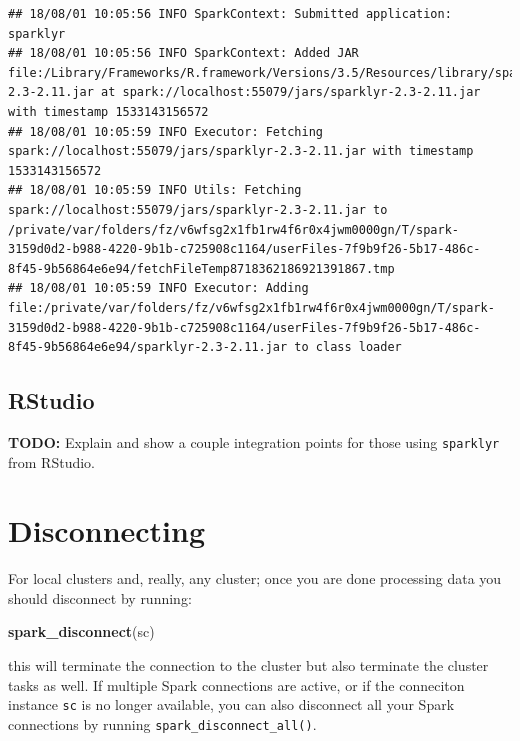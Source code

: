 \documentclass[]{book}
\newenvironment{Shaded}{\begin{snugshade}}{\end{snugshade}}
\newcommand{\KeywordTok}[1]{\textcolor[rgb]{0.13,0.29,0.53}{\textbf{#1}}}
\newcommand{\NormalTok}[1]{#1}
\theoremstyle{definition}
\theoremstyle{definition}
\theoremstyle{definition}
\theoremstyle{remark}
\begin{document}
\begin{verbatim}
## 18/08/01 10:05:56 INFO SparkContext: Submitted application: sparklyr
## 18/08/01 10:05:56 INFO SparkContext: Added JAR file:/Library/Frameworks/R.framework/Versions/3.5/Resources/library/sparklyr/java/sparklyr-2.3-2.11.jar at spark://localhost:55079/jars/sparklyr-2.3-2.11.jar with timestamp 1533143156572
## 18/08/01 10:05:59 INFO Executor: Fetching spark://localhost:55079/jars/sparklyr-2.3-2.11.jar with timestamp 1533143156572
## 18/08/01 10:05:59 INFO Utils: Fetching spark://localhost:55079/jars/sparklyr-2.3-2.11.jar to /private/var/folders/fz/v6wfsg2x1fb1rw4f6r0x4jwm0000gn/T/spark-3159d0d2-b988-4220-9b1b-c725908c1164/userFiles-7f9b9f26-5b17-486c-8f45-9b56864e6e94/fetchFileTemp8718362186921391867.tmp
## 18/08/01 10:05:59 INFO Executor: Adding file:/private/var/folders/fz/v6wfsg2x1fb1rw4f6r0x4jwm0000gn/T/spark-3159d0d2-b988-4220-9b1b-c725908c1164/userFiles-7f9b9f26-5b17-486c-8f45-9b56864e6e94/sparklyr-2.3-2.11.jar to class loader
\end{verbatim}

\hypertarget{using-spark-from-rstudio}{%
\subsection{RStudio}\label{using-spark-from-rstudio}}

\textbf{TODO:} Explain and show a couple integration points for those
using \texttt{sparklyr} from RStudio.

\hypertarget{disconnecting}{%
\section{Disconnecting}\label{disconnecting}}

For local clusters and, really, any cluster; once you are done
processing data you should disconnect by running:

\begin{Shaded}
\begin{Highlighting}[]
\KeywordTok{spark_disconnect}\NormalTok{(sc)}
\end{Highlighting}
\end{Shaded}

this will terminate the connection to the cluster but also terminate the
cluster tasks as well. If multiple Spark connections are active, or if
the conneciton instance \texttt{sc} is no longer available, you can also
disconnect all your Spark connections by running
\texttt{spark\_disconnect\_all()}.
\end{document}
